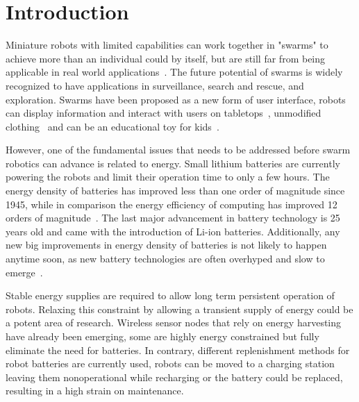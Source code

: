 \chapter{Introduction}
\label{chp:introduction}




Miniature robots with limited capabilities can work together in "swarms" to achieve more than an individual could by itself, but are still far from being applicable in real world applications~\cite{barca_sekercioglu_2013}.
The future potential of swarms is widely recognized to have applications in surveillance, search and rescue, and exploration.
Swarms have been proposed as a new form of user interface, robots can display information and interact with users on tabletops~\cite{legoc_uist_2016}, unmodified clothing~\cite{dementyev_uist_2016} and can be an educational toy for kids~\cite{sony_toio_2017}.
\hfill \break


However, one of the fundamental issues that needs to be addressed before swarm robotics can advance is related to energy.
Small lithium batteries are currently powering the robots and limit their operation time to only a few hours. 
The energy density of batteries has improved less than one order of magnitude since 1945, while in comparison the energy efficiency of computing has improved 12 orders of magnitude~\cite{patel_pvc_2017}.
The last major advancement in battery technology is 25 years old and came with the introduction of Li-ion batteries.
Additionally, any new big improvements in energy density of batteries is not likely to happen anytime soon, as new battery technologies are often overhyped and slow to emerge~\cite{zachary_spec_2016}.
\hfill \break



Stable energy supplies are required to allow long term persistent operation of robots.
Relaxing this constraint by allowing a transient supply of energy could be a potent area of research.
Wireless sensor nodes that rely on energy harvesting have already been emerging, some are highly energy constrained but fully eliminate the need for batteries. %
In contrary, different replenishment methods for robot batteries are currently used, robots can be moved to a charging station leaving them nonoperational while recharging or the battery could be replaced, resulting in a high strain on maintenance.

